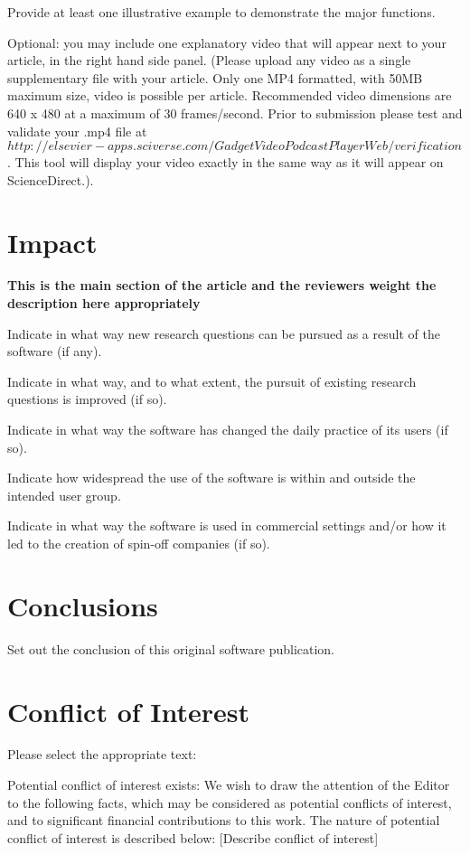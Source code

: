 \documentclass[preprint,12pt, a4paper]{elsarticle}
\begin{document}
Provide at least one illustrative example to demonstrate the major functions.

Optional: you may include one explanatory video that will appear next to your article, in the right hand side panel. (Please upload any video as a single supplementary file with your article. Only one MP4 formatted, with 50MB maximum size, video is possible per article. Recommended video dimensions are 640 x 480 at a maximum of 30 frames/second. Prior to submission please test and validate your .mp4 file at $ http://elsevier-apps.sciverse.com/GadgetVideoPodcastPlayerWeb/verification$. This tool will display your video exactly in the same way as it will appear on ScienceDirect.).

\section{Impact}
\label{}

\textbf{This is the main section of the article and the reviewers weight the description here appropriately}

Indicate in what way new research questions can be pursued as a result of the software (if any).

Indicate in what way, and to what extent, the pursuit of existing research questions is improved (if so).

Indicate in what way the software has changed the daily practice of its users (if so).

Indicate how widespread the use of the software is within and outside the intended user group.

Indicate in what way the software is used in commercial settings and/or how it led to the creation of spin-off companies (if so).

\section{Conclusions}
\label{}

Set out the conclusion of this original software publication.

\section{Conflict of Interest}
Please select the appropriate text:

Potential conflict of interest exists:
We wish to draw the attention of the Editor to the following facts, which may be considered as potential conflicts of interest, and to significant financial contributions to this work. The nature of potential conflict of interest is described below: [Describe conflict of interest]
\end{document}
